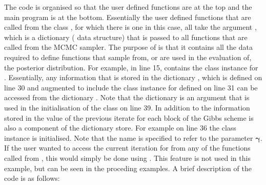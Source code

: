 \documentclass[article]{jss}
\begin{document}
The code is organised so that the user defined functions are at the
top and the main program is at the bottom.  Essentially the user
defined functions that are called from the class , for
which there is one in this case, all take the argument ,
which is a dictionary ( data structure) that is
passed to all functions that are called from the MCMC sampler.  The
purpose of  is that it contains all the data required to
define functions that sample from, or are used in the evaluation of,
the posterior distribution. For example, in line 15,
 contains the class instance for
.  Essentially, any information that is stored
in the dictionary , which is defined on line 30 and
augmented to include the class instance for 
defined on line 31 can be accessed from the dictionary .
Note that the dictionary  is an argument that is used in
the initialisation of the  class on line 39. In addition to
the information stored in  the value of the previous
iterate for each block of the Gibbs scheme is also a component of the
dictionary store. For example on line 36 the class instance
 is initialised. Note that the name  is
specified to refer to the parameter $\bm{\gamma}.$ If the user wanted
to access the current iteration for  from any of the
functions called from , this would simply be done using
.  This feature is not used in this example,
but can be seen in the proceding examples. A brief description of the
code is as follows:
\end{document}
